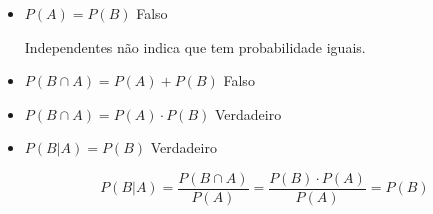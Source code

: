 \item
	\begin{itemize}
	\item $P(A) = P(B)$ Falso

	Independentes não indica que tem probabilidade iguais.

	\item $P(B \cap A) = P(A) + P(B)$ Falso

	\item $P(B \cap A) = P(A) \cdot P(B)$ Verdadeiro

	\item $P(B|A) = P(B)$ Verdadeiro

	\[P(B|A) = \frac{{P(B \cap A)}}{{P(A)}} = \frac{{P(B) \cdot P(A)}}{{P(A)}} = P(B)\]

	\end{itemize}